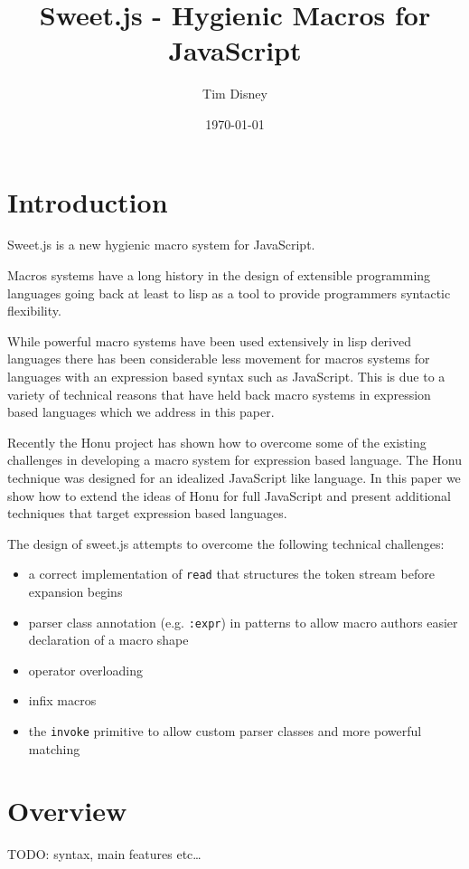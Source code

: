 \documentclass[preprint,10pt]{sigplanconf}
\author{Tim Disney}
\date{\today}
\title{Sweet.js - Hygienic Macros for JavaScript}
\begin{document}
\maketitle

\section{Introduction}
\label{sec-1}

Sweet.js is a new hygienic macro system for JavaScript.

Macros systems have a long history in the design of extensible
programming languages going back at least to lisp as a tool to provide
programmers syntactic flexibility.

While powerful macro systems have been used extensively in lisp
derived languages there has been considerable less movement for macros
systems for languages with an expression based syntax such as
JavaScript. This is due to a variety of technical reasons that have
held back macro systems in expression based languages which we address
in this paper.

Recently the Honu project has shown how to overcome some of the
existing challenges in developing a macro system for expression based
language. The Honu technique was designed for an idealized JavaScript
like language. In this paper we show how to extend the ideas of Honu
for full JavaScript and present additional techniques that target
expression based languages.

The design of sweet.js attempts to overcome the following technical
challenges: 

\begin{itemize}
\item a correct implementation of \texttt{read} that structures the token stream
before expansion begins
\item parser class annotation (e.g. \texttt{:expr}) in patterns to allow macro
authors easier declaration of a macro shape
\item operator overloading
\item infix macros
\item the \texttt{invoke} primitive to allow custom parser classes and more
powerful matching
\end{itemize}

\section{Overview}
\label{sec-2}
TODO: syntax, main features etc\ldots
\end{document}
